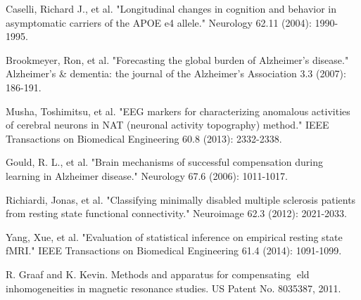 \documentclass[journal]{IEEEtran}
\begin{document}
{	
	
	
	
	\begin{thebibliography}{1}
		
		Caselli, Richard J., et al. "Longitudinal changes in cognition and behavior in asymptomatic carriers of the APOE e4 allele." Neurology 62.11 (2004): 1990-1995.
		
		Brookmeyer, Ron, et al. "Forecasting the global burden of Alzheimer’s disease." Alzheimer's \& dementia: the journal of the Alzheimer's Association 3.3 (2007): 186-191.
		
		Musha, Toshimitsu, et al. "EEG markers for characterizing anomalous activities of cerebral neurons in NAT (neuronal activity topography) method." IEEE Transactions on Biomedical Engineering 60.8 (2013): 2332-2338.
		
		Gould, R. L., et al. "Brain mechanisms of successful compensation during learning in Alzheimer disease." Neurology 67.6 (2006): 1011-1017.
		
		Richiardi, Jonas, et al. "Classifying minimally disabled multiple sclerosis patients from resting state functional connectivity." Neuroimage 62.3 (2012): 2021-2033.
		
		Yang, Xue, et al. "Evaluation of statistical inference on empirical resting state fMRI." IEEE Transactions on Biomedical Engineering 61.4 (2014): 1091-1099.
		
		R. Graaf and K. Kevin. Methods and apparatus for
		compensating eld inhomogeneities in magnetic resonance
		studies. US Patent No. 8035387, 2011.
		

\end{thebibliography}}
\end{document}
